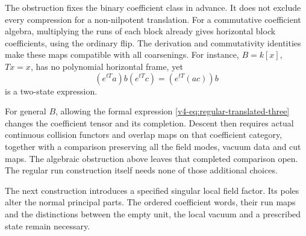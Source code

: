 The obstruction fixes the binary coefficient
class in advance. It does not exclude every
compression for a non-nilpotent translation.
For a commutative coefficient algebra, multiplying
the runs of each block already gives horizontal
block coefficients, using the ordinary flip.
The derivation and commutativity identities make
these maps compatible with all coarsenings.
For instance, \(B=k[x]\), \(Tx=x\), has no
polynomial horizontal frame, yet
\[
           (e^{tT}a)b(e^{tT}c)=(e^{tT}(ac))b
\]
is a two-state expression.

For general \(B\), allowing the formal expression
\eqref{v4-eq:regular-translated-three} changes the
coefficient tensor and its completion. Descent then
requires actual continuous collision functors and
overlap maps on that coefficient category, together
with a comparison preserving all the field modes,
vacuum data and cut maps. The algebraic obstruction
above leaves that completed comparison open.
The regular run construction itself needs none of
those additional choices.

The next construction introduces a specified singular
local field factor. Its poles alter the normal
principal parts. The ordered coefficient words,
their run maps and the distinctions between the
empty unit, the local vacuum and a prescribed
state remain necessary.
